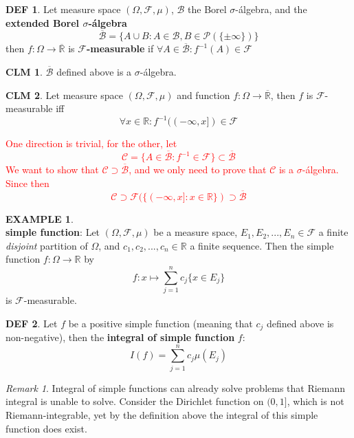 \documentclass[hidelinks]{article}
\theoremstyle{definition}
\newtheorem*{defin}{DEF}
\newtheorem*{eg}{EXAMPLE}
\theoremstyle{dotless}
\newtheorem{claim}{CLM}[section]
\theoremstyle{remark}
\newtheorem*{remark}{Remark}
\begin{document}
\begin{defin}
Let measure space $(\Omega,\mathscr{F},\mu)$, $\mathscr{B}$ the Borel $\sigma$-álgebra, and the \textbf{extended Borel $\sigma$-álgebra} \[\overline{\mathscr{B}}=\{A\cup B:A\in\mathscr{B},B\in\mathscr{P}(\{\pm\infty\})\}\]
then $f:\Omega\to\overline{\mathbb{R}}$ is \textbf{$\mathscr{F}$-measurable} if $\forall A\in\overline{\mathscr{B}}:f^{-1}(A)\in\mathscr{F}$
\end{defin}

\begin{claim}
$\overline{\mathscr{B}}$ defined above is a $\sigma$-álgebra.
\end{claim}

\begin{claim}\label{CLM 8.15}
Let measure space $(\Omega,\mathscr{F},\mu)$ and function $f:\Omega\to\overline{\mathbb{R}}$, then $f$ is $\mathscr{F}$-measurable iff \[\forall x\in\mathbb{R}:f^{-1}((-\infty,x])\in\mathscr{F}\]
\end{claim}
\textcolor{red}{One direction is trivial, for the other, let
\[\mathscr{C}=\{A\in\overline{\mathscr{B}}:f^{-1}\in\mathscr{F}\}\subset\overline{\mathscr{B}}\]
We want to show that $\mathscr{C}\supset\overline{\mathscr{B}}$, and we only need to prove that $\mathscr{C}$ is a $\sigma$-álgebra. Since then
\[\mathscr{C}\supset\mathscr{F}(\{(-\infty,x]:x\in\mathbb{R}\})\supset\overline{\mathscr{B}}\]}

\begin{eg}~\\
\textbf{simple function}: Let $(\Omega,\mathscr{F},\mu)$ be a measure space, $E_1,E_2,...,E_n\in\mathscr{F}$ a finite \emph{disjoint} partition of $\Omega$, and $c_1,c_2,...,c_n\in\mathbb{R}$ a finite sequence. Then the simple function $f:\Omega\to\mathbb{R}$ by \[f:x\mapsto\sum_{j=1}^nc_j\{x\in E_j\}\]
is $\mathscr{F}$-measurable.
\end{eg}

\begin{defin}
Let $f$ be a positive simple function (meaning that $c_j$ defined above is non-negative), then the \textbf{integral of simple function} $f$:
\[I(f)=\sum_{j=1}^nc_j\mu(E_j)\]
\end{defin}

\begin{remark}
Integral of simple functions can already solve problems that Riemann integral is unable to solve. Consider the Dirichlet function on $(0,1]$, which is not Riemann-integrable, yet by the definition above the integral of this simple function does exist.
\end{remark}
\end{document}
